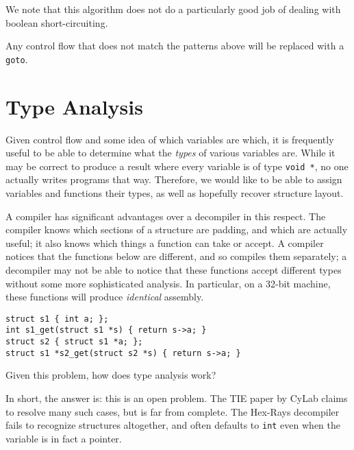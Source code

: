 \documentclass{article}
\begin{document}
We note that this algorithm does not do a particularly good job of dealing
with boolean short-circuiting.

Any control flow that does not match the patterns above will be replaced
with a \verb+goto+.
\section{Type Analysis}
Given control flow and some idea of which variables are which, it is frequently useful to be
able to determine what the {\em types} of various variables are. While it may be correct
to produce a result where every variable is of type \verb+void *+, no one actually writes
programs that way. Therefore, we would like to be able to assign variables and functions their
types, as well as hopefully recover structure layout.

A compiler has significant advantages over a decompiler in this respect. The compiler knows
which sections of a structure are padding, and which are actually useful; it also knows which
things a function can take or accept. A compiler notices that the functions below are 
different, and so compiles them separately; a decompiler may not be able to notice that these
functions accept different types without some more sophisticated analysis. In particular, 
on a 32-bit machine, these functions will produce {\em identical} assembly.

\begin{verbatim}
struct s1 { int a; };
int s1_get(struct s1 *s) { return s->a; }
struct s2 { struct s1 *a; };
struct s1 *s2_get(struct s2 *s) { return s->a; }
\end{verbatim}

Given this problem, how does type analysis work?

In short, the answer is: this is an open problem. The TIE paper by CyLab claims to resolve
many such cases, but is far from complete. The Hex-Rays decompiler fails to recognize structures
altogether, and often defaults to \verb+int+ even when the variable is in fact a pointer.
\end{document}
